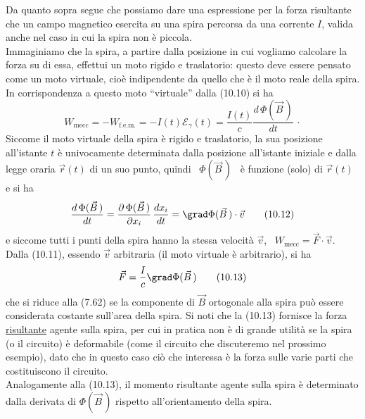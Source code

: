 Da quanto sopra segue che possiamo dare una espressione per la forza risultante
che un campo magnetico esercita su una spira percorsa da una corrente $I$,
valida anche nel caso in cui la spira non \`e piccola.\\
Immaginiamo che la spira, a partire dalla posizione in cui vogliamo calcolare la
forza su di essa, effettui un moto rigido e traslatorio: questo deve essere
pensato come un moto virtuale, cio\`e indipendente da quello che \`e il moto
reale della spira. In corrispondenza a questo moto ``virtuale'' dalla (10.10) si
ha
\begin{equation}
  W_\mathrm{mecc}=-W_\mathrm{f.e.m.}
  =-I(t)\mathcal E_\gamma(t)=\frac{I(t)}{c}\frac{d\,\Phi(\vec B\,)}{dt}\,\cdot
  \tag{10.11}
\end{equation}
Siccome il moto virtuale della spira \`e rigido e traslatorio, la sua posizione
all'istante $t$ \`e univocamente determinata dalla posizione all'istante
iniziale e dalla legge oraria $\vec r(t)$ di un suo punto, quindi
\ $\Phi(\vec B\,)$ \ \`e funzione (solo) di $\vec r(t)$ e si ha
\begin{equation}
  \frac{d\,\Phi(\vec B\,)}{dt}
  =\frac{\partial\,\Phi(\vec B\,)}{\partial x_i}\,\frac{dx_i}{dt}
  =\grad\Phi(\vec B\,)\cdot\vec v
  \tag{10.12}
\end{equation}
e siccome tutti i punti della spira hanno la stessa velocit\`a $\vec v$,
\ $W_\mathrm{mecc}=\vec F\cdot\vec v$. Dalla (10.11), essendo $\vec v$
arbitraria (il moto virtuale \`e arbitrario), si ha
\begin{equation}
  \vec F=\frac{I}{c}\grad\Phi(\vec B\,)
  \tag{10.13}
\end{equation}
che si riduce alla (7.62) se la componente di $\vec B$ ortogonale alla spira
pu\`o essere considerata costante sull'area della spira. Si noti che la (10.13)
fornisce la forza \underline{risultante} agente sulla spira, per cui in pratica
non \`e di grande utilit\`a se la spira (o il circuito) \`e deformabile (come il
circuito che discuteremo nel prossimo esempio), dato che in questo caso ci\`o
che interessa \`e la forza sulle varie parti che costituiscono il circuito.\\
Analogamente alla (10.13), il momento risultante agente sulla spira \`e
determinato dalla derivata di $\Phi(\vec B\,)$ rispetto all'orientamento della
spira.

